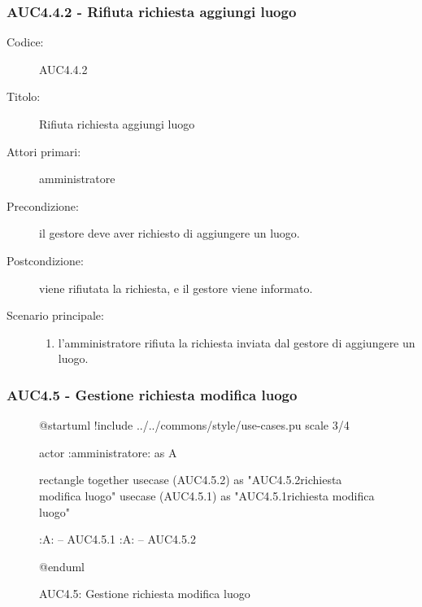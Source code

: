 \documentclass[casi-duso]{subfiles}
\begin{document}
\subsubsection{AUC4.4.2 - Rifiuta richiesta aggiungi luogo}%
\label{subsub:AUC4.4.2}
\begin{description}
  \item[Codice:] AUC4.4.2
  \item[Titolo:] Rifiuta richiesta aggiungi luogo
  \item[Attori primari:] amministratore
  \item[Precondizione:] il gestore deve aver richiesto di aggiungere un luogo.
  \item[Postcondizione:] viene rifiutata la richiesta, e il gestore viene informato.
  \item[Scenario principale:]
  \begin{enumerate}
    \item l'amministratore rifiuta la richiesta inviata dal gestore di aggiungere un luogo.
  \end{enumerate}
\end{description}

\subsubsection{AUC4.5 - Gestione richiesta modifica luogo}%
\label{subsub:AUC4.5}

\begin{figure}[h!]
  \centering
  \begin{plantuml}
  @startuml
  !include ../../commons/style/use-cases.pu
  scale 3/4

  actor :amministratore: as A

  rectangle {
    together {
      usecase (AUC4.5.2) as "AUC4.5.2\nRifiuta richiesta modifica luogo"
      usecase (AUC4.5.1) as "AUC4.5.1\nAccetta richiesta modifica luogo"
    }
  }

  :A: -- AUC4.5.1
  :A: -- AUC4.5.2

  @enduml
  \end{plantuml}
  \caption{AUC4.5: Gestione richiesta modifica luogo}
  \label{fig:auc }
\end{figure}
\end{document}
